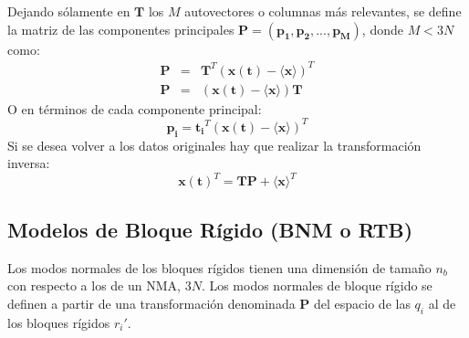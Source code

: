 Dejando s\'{o}lamente en $\mathbf{T}$ los $M$ autovectores o columnas m\'{a}s relevantes, se define la matriz de las componentes principales $\mathbf{P}=\left(\mathbf{p_1},\mathbf{p_2},...,\mathbf{p_{M}}\right)$, donde $M<3N$ como:
\begin{eqnarray}\label{eq:31}
\mathbf{P}&=&\mathbf{T}^T(\mathbf{x(t)}-\langle\mathbf{x}\rangle)^T \nonumber \\
\mathbf{P}&=&(\mathbf{x(t)}-\langle\mathbf{x}\rangle)\mathbf{T}
\end{eqnarray}
O en t\'{e}rminos de cada componente principal:
\begin{equation}\label{eq:32}
\mathbf{p_i}=\mathbf{t_i}^T(\mathbf{x(t)}-\langle\mathbf{x}\rangle)^T
\end{equation}
Si se desea volver a los datos originales hay que realizar la transformaci\'{o}n inversa:
\begin{equation}\label{eq:33}
\mathbf{x(t)}^T=\mathbf{T}\mathbf{P}+\langle\mathbf{x}\rangle^T
\end{equation}
\subsection{Modelos de Bloque R\'{i}gido (BNM o RTB)}
Los modos normales de los bloques r\'{i}gidos tienen una dimensi\'{o}n de tama\~{n}o $n_b$ con respecto a los de un NMA, $3N$. Los modos normales de bloque r\'{i}gido se definen a partir de una transformaci\'{o}n denominada $\mathbf{P}$ del espacio de las ${q_i}$ al de los bloques r\'{i}gidos $r_i'$.\\

